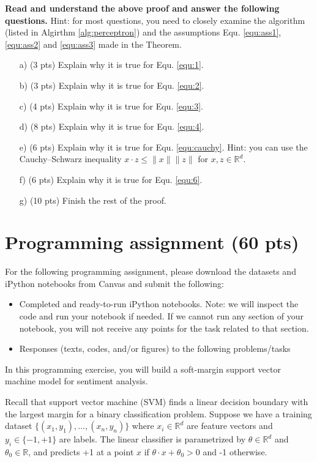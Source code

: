 \documentclass[12pt]{article}
\newcommand{\prsol}[1]{\ifthenelse{\boolean{sol}}{{\color{blue}\textbf{Solution:} #1}}{} }
\begin{document}
\textbf{Read and understand the above proof and answer the following questions.} Hint: for most questions, you need to closely examine the algorithm (listed in Algirthm \ref{alg:perceptron}) and the assumptions Equ. \eqref{equ:ass1}, \eqref{equ:ass2} and \eqref{equ:ass3} made in the Theorem.
\begin{enumerate}
    \item[a)] (3 pts) Explain why it is true for Equ. \eqref{equ:1}.
    \item[b)] (3 pts) Explain why it is true for Equ. \eqref{equ:2}.
    \item[c)] (4 pts) Explain why it is true for Equ. \eqref{equ:3}.
    \item[d)] (8 pts) Explain why it is true for Equ. \eqref{equ:4}.
    \item[e)] (6 pts) Explain why it is true for Equ. \eqref{equ:cauchy}. Hint: you can use the Cauchy–Schwarz inequality $x\cdot z\leq \|x\|\|z\|$ for $x,z\in\mathbb{R}^d$.
    \item[f)] (6 pts) Explain why it is true for Equ. \eqref{equ:6}.
    \item[g)] (10 pts) Finish the rest of the proof.
\end{enumerate}

\prsol{


}



\section{Programming assignment (60 pts)}

For the following programming assignment, please download the datasets and iPython notebooks from Canvas and submit the following:
\begin{itemize}
    \item Completed and ready-to-run iPython notebooks. Note: we will inspect the code and run your notebook if needed. If we cannot run any section of your notebook, you will not receive any points for the task related to that section. 
    \item Responses (texts, codes, and/or figures) to the following problems/tasks
\end{itemize}


In this programming exercise, you will build a soft-margin support vector machine model for sentiment analysis.

Recall that support vector machine (SVM) finds a linear decision boundary with the largest margin for a binary classification problem. Suppose we have a training dataset $\{(x_{1},y_1),...,(x_n,y_n)\}$
where $x_{i} \in \mathbb{R}^{d}$ are feature vectors and $y_i\in\{-1,+1\}$ are labels.  The linear classifier is parametrized by $\theta\in \mathbb{R}^{d}$ and $\theta_0\in\mathbb{R}$, and predicts +1 at a point $x$ if $\theta\cdot x+\theta_0>0$ and -1 otherwise. 
\end{document}
